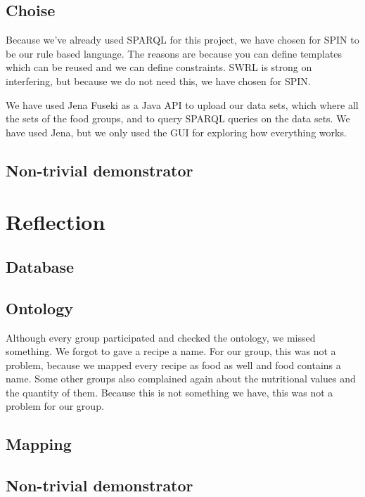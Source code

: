 \subsection*{Choise}
Because we've already used SPARQL for this project, we have chosen for SPIN to be our rule based language. The reasons are because you can define templates which can be reused and we can define constraints. SWRL is strong on interfering, but because we do not need this, we have chosen for SPIN.

We have used Jena Fuseki as a Java API to upload our data sets, which where all the sets of the food groups, and to query SPARQL queries on the data sets. We have used Jena, but we only used the GUI for exploring how everything works. 
\subsection{Non-trivial demonstrator}

\section{Reflection}
\subsection*{Database} 

\subsection*{Ontology} 
Although every group participated and checked the ontology, we missed something. We forgot to gave a recipe a name. For our group, this was not a problem, because we mapped every recipe as food as well and food contains a name. Some other groups also complained again about the nutritional values and the quantity of them. Because this is not something we have, this was not a problem for our group. 

\subsection*{Mapping} 

\subsection*{Non-trivial demonstrator} 


